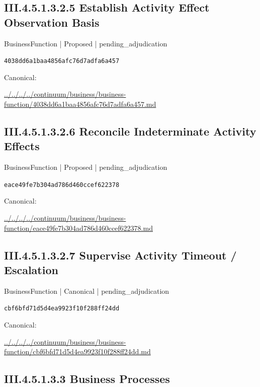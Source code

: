 \documentclass[10pt,a4paper]{article}
\begin{document}
\subsection*{III.4.5.1.3.2.5 Establish Activity Effect Observation Basis}
\label{element-4038dd6a1baa4856afc76d7adfa6a457}
{\small BusinessFunction | Proposed | pending\_adjudication}\par
\texttt{4038dd6a1baa4856afc76d7adfa6a457}\par
Canonical: \par
{\footnotesize\url{../../../../continuum/business/business-function/4038dd6a1baa4856afc76d7adfa6a457.md}}\par
\subsection*{III.4.5.1.3.2.6 Reconcile Indeterminate Activity Effects}
\label{element-eace49fe7b304ad786d460ccef622378}
{\small BusinessFunction | Proposed | pending\_adjudication}\par
\texttt{eace49fe7b304ad786d460ccef622378}\par
Canonical: \par
{\footnotesize\url{../../../../continuum/business/business-function/eace49fe7b304ad786d460ccef622378.md}}\par
\subsection*{III.4.5.1.3.2.7 Supervise Activity Timeout / Escalation}
\label{element-cbf6bfd71d5d4ea9923f10f288ff24dd}
{\small BusinessFunction | Canonical | pending\_adjudication}\par
\texttt{cbf6bfd71d5d4ea9923f10f288ff24dd}\par
Canonical: \par
{\footnotesize\url{../../../../continuum/business/business-function/cbf6bfd71d5d4ea9923f10f288ff24dd.md}}\par
\subsection*{III.4.5.1.3.3 Business Processes}
\end{document}
